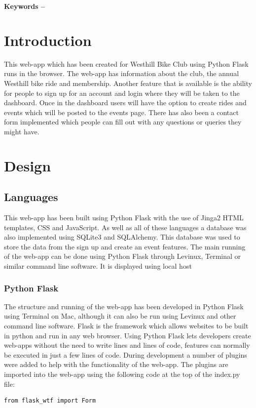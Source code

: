 \documentclass[10pt, a4paper]{article}
\title{\mytitle}
\author{\myauthor\hspace{1em}\\\contact\\Edinburgh Napier University\hspace{0.5em}-\hspace{0.5em}\mymodule}
\date{}
\begin{document}
	\maketitle
	\begin{abstract}
	 This report covers the design of the web-app including URL hierarchy, enhancements, critical evaluation and personal evaluation. 
	\end{abstract}
    
	\textbf{Keywords -- }{\mykeywords}

	\section{Introduction}
	This web-app which has been created for Westhill Bike Club using Python Flask runs in the browser. The web-app has information about the club, the annual Westhill bike ride and membership. Another feature that is available is the ability for people to sign up for an account and login where they will be taken to the dashboard. Once in the dashboard users will have the option to create rides and events which will be posted to the events page. There has also been a contact form implemented which people can fill out with any questions or queries they might have. 
	
	\section{Design}
	\subsection{Languages}
	This web-app has been built using Python Flask with the use of Jinga2 HTML templates, CSS and JavaScript. As well as all of these languages a database was also implemented using SQLite3 and SQLAlchemy. This database was used to store the data from the sign up and create an event features. The main running of the web-app can be done using Python Flask through Levinux, Terminal or similar command line software. It is displayed using local host 
	
	\subsubsection{Python Flask}
	The structure and running of the web-app has been developed in Python Flask using Terminal on Mac, although it can also be run using Levinux and other command line software. Flask is the framework which allows websites to be built in python and run in any web browser. Using Python Flask lets developers create web-apps without the need to write lines and lines of code, features can normally be executed in just a few lines of code. During development a number of plugins were added to help with the functionality of the web-app. The plugins are imported into the web-app using the following code at the top of the index.py file: 
	\begin{lstlisting}[Import Add-ons for flask_wtf Forms]
    from flask_wtf import Form\end{lstlisting}
	
\end{document}
